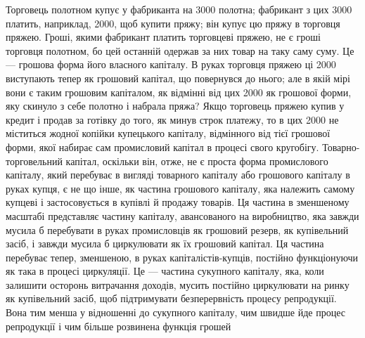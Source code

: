 Торговець полотном купує у фабриканта на 3000 полотна; фабрикант з цих 3000 платить,
наприклад, 2000, щоб купити пряжу;
він купує цю пряжу в торговця пряжею. Гроші, якими фабрикант
платить торговцеві пряжею, не є гроші торговця полотном,
бо цей останній одержав за них товар на таку саму суму. Це —
грошова форма його власного капіталу. В руках торговця пряжею
ці 2000 виступають тепер як грошовий
капітал, що повернувся до нього; але в якій мірі вони є таким
грошовим капіталом, як відмінні від цих 2000
як грошової форми, яку скинуло з себе полотно і набрала
пряжа? Якщо торговець пряжею купив у кредит і продав за
готівку до того, як минув строк платежу, то в цих 2000 не міститься жодної копійки купецького капіталу,
відмінного від тієї грошової форми, якої набирає сам промисловий
капітал в процесі свого кругобігу. Товарно-торговельний
капітал, оскільки він, отже, не є проста форма промислового
капіталу, який перебуває в вигляді товарного капіталу або грошового
капіталу в руках купця, є не що інше, як частина грошового
капіталу, яка належить самому купцеві і застосовується
в купівлі й продажу товарів. Ця частина в зменшеному масштабі
представляє частину капіталу, авансованого на виробництво,
яка завжди мусила б перебувати в руках промисловців
як грошовий резерв, як купівельний засіб, і завжди мусила б
циркулювати як їх грошовий капітал. Ця частина перебуває тепер,
зменшеною, в руках капіталістів-купців, постійно функціонуючи
як така в процесі циркуляції. Це — частина сукупного
капіталу, яка, коли залишити осторонь витрачання доходів,
мусить постійно циркулювати на ринку як купівельний засіб,
щоб підтримувати безперервність процесу репродукції. Вона
тим менша у відношенні до сукупного капіталу, чим швидше
йде процес репродукції і чим більше розвинена функція грошей
